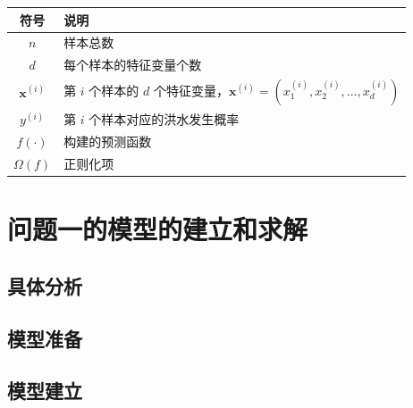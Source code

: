 \documentclass[withoutpreface,bwprint]{cumcmthesis}
\begin{document}
\begin{table}[H]
	\centering
	
	\begin{tabularx}{\textwidth}{CL}
		\toprule
		符号    & 说明    \\
		\midrule
		$n$ & 样本总数 \\
		$d$ & 每个样本的特征变量个数 \\
		$\boldsymbol{x}^{(i)}$ & 第 $i$ 个样本的 $d$ 个特征变量，$\boldsymbol{x}^{(i)} = (x_1^{(i)}, x_2^{(i)}, \dots, x_d^{(i)})$ \\
		$y^{(i)}$ & 第 $i$ 个样本对应的洪水发生概率 \\
		$f(\cdot)$ & 构建的预测函数 \\
		$\Omega(f)$ & 正则化项 \\

		\bottomrule
	\end{tabularx}
	
	\label{tab:符号说明}
\end{table}











\newpage
\section{问题一的模型的建立和求解}
\subsection{具体分析}






\subsection{模型准备}





\subsection{模型建立}
\end{document}

